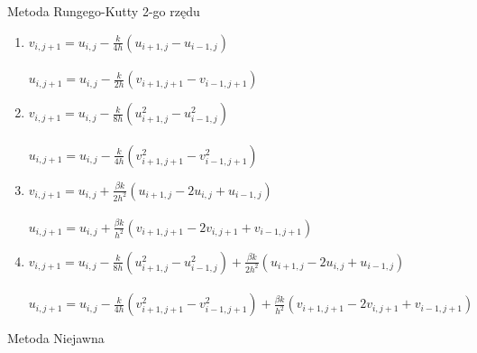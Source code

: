 \documentclass[12pt, a4paper]{report}
\begin{document}
\begin{center}
\large{Metoda Rungego-Kutty 2-go rzędu}
\end{center}

\begin{enumerate}
\item$v_{i,j+1}=u_{i,j}-\frac{k}{4h}(u_{i+1,j}-u_{i-1,j})$\\\\
$u_{i,j+1}=u_{i,j}-\frac{k}{2h}(v_{i+1,j+1}-v_{i-1,j+1})$

\item$v_{i,j+1}=u_{i,j}-\frac{k}{8h}(u_{i+1,j}^{2}-u_{i-1,j}^{2})$\\\\
$u_{i,j+1}=u_{i,j}-\frac{k}{4h}(v_{i+1,j+1}^{2}-v_{i-1,j+1}^{2})$

\item$v_{i,j+1}=u_{i,j}+\frac{\beta k}{2h^{2}}(u_{i+1,j}-2u_{i,j}+u_{i-1,j})$\\\\
$u_{i,j+1}=u_{i,j}+\frac{\beta k}{h^{2}}(v_{i+1,j+1}-2v_{i,j+1}+v_{i-1,j+1})$

\item$v_{i,j+1}=u_{i,j}-\frac{k}{8h}(u_{i+1,j}^{2}-u_{i-1,j}^{2})+\frac{\beta k}{2h^{2}}(u_{i+1,j}-2u_{i,j}+u_{i-1,j})$\\\\
$u_{i,j+1}=u_{i,j}-\frac{k}{4h}(v_{i+1,j+1}^{2}-v_{i-1,j+1}^{2})+\frac{\beta k}{h^{2}}(v_{i+1,j+1}-2v_{i,j+1}+v_{i-1,j+1})$
\end{enumerate}

\newpage

\begin{center}
\large{Metoda Niejawna}
\end{center}
\end{document}
